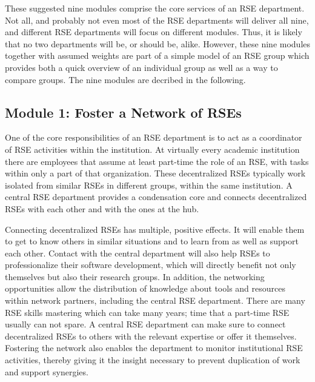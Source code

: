 \documentclass[a4paper]{article}
\begin{document}
These suggested nine modules comprise the core services of an RSE department.
Not all, and probably not even most of the RSE departments will deliver all nine, and different RSE departments will focus on different modules.
Thus, it is likely that no two departments will be, or should be, alike.
However, these nine modules together with assumed weights are part of a simple model of an RSE group which provides both a quick overview of an individual group as well as a way to compare groups.
The nine modules are decribed in the following.

\subsection{Module 1: Foster a Network of RSEs}
\label{sec:network}

One of the core responsibilities of an RSE department is to act as a coordinator of RSE activities within the institution.
At virtually every academic institution there are employees that assume at least part-time the role of an RSE, with tasks within only a part of that organization.
These decentralized RSEs typically work isolated from similar RSEs in different groups, within the same institution.
A central RSE department provides a condensation core and connects decentralized RSEs with each other and with the ones at the hub.

Connecting decentralized RSEs has multiple, positive effects.
It will enable them to get to know others in similar situations and to learn from as well as support each other.
Contact with the central department will also help RSEs to professionalize their software development, which will directly benefit not only themselves but also their research groups.
In addition, the networking opportunities allow the distribution of knowledge about tools and resources within network partners, including the central RSE department.
There are many RSE skills mastering which can take many years; time that a part-time RSE usually can not spare.
A central RSE department can make sure to connect decentralized RSEs to others with the relevant expertise or offer it themselves.
Fostering the network also enables the department to monitor institutional RSE activities, thereby giving it the insight necessary to prevent duplication of work and support synergies.
\end{document}
